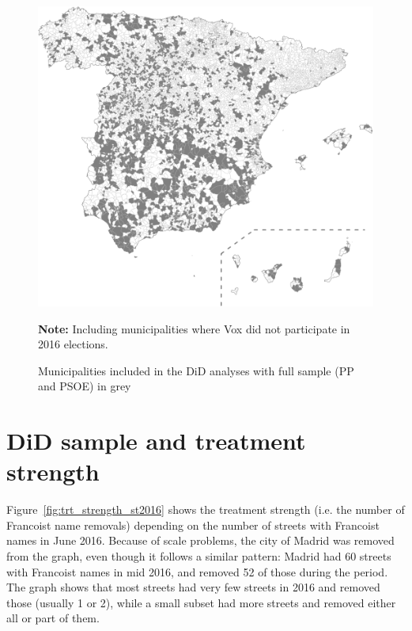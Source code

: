 \documentclass[12pt, titlepage]{article}
\begin{document}
\begin{figure}[htb!]
\centering

  \includegraphics[width = \textwidth]{img/map_full}

  \caption{Municipalities included in the DiD analyses with full sample (PP and PSOE) in grey}\label{fig:map_full}
  
    \vspace{5pt}
    
    \parbox[t]{1\textwidth}{\footnotesize{\textbf{Note:} Including municipalities where Vox did not participate in 2016 elections.}}

\end{figure}


\clearpage
\section{DiD sample and treatment strength}\label{app:treatment_strength}

Figure~\ref{fig:trt_strength_st2016} shows the treatment strength (i.e. the number of Francoist name removals) depending on the number of streets with Francoist names in June 2016. Because of scale problems, the city of Madrid was removed from the graph, even though it follows a similar pattern: Madrid had 60 streets with Francoist names in mid 2016, and removed 52 of those during the period.
The graph shows that most streets had very few streets in 2016 and removed those (usually 1 or 2), while a small subset had more streets and removed either all or part of them.
\end{document}
